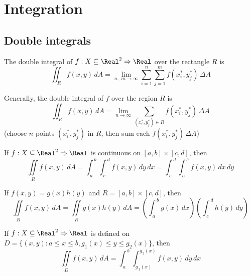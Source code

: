 \section{Integration}

\subsection{Double integrals}



\begin{definition}
  The double integral of $f : X \subseteq \Real^2 \Rightarrow \Real$ over the rectangle $R$ is
  \[
    \iint_{R}{{f\left( {x,y} \right)\,dA}} = \mathop {\lim }_{n,\,\,m \to \infty } \sum_{i = 1}^n {\sum_{j = 1}^m {f\left( {x_i^*,y_j^*} \right)\,\Delta A} }
  \]

  Generally, the double integral of $f$ over the region $R$ is
  \[
    \iint_{R}{{f\left( {x,y} \right)\,dA}} = \mathop {\lim }_{n \to \infty } \sum_{(x_i^*, y_j^*) \in R} {f\left( {x_i^*,y_j^*} \right)\,\Delta A}
  \]
  (choose $n$ points $(x_i^*, y_j^*)$ in $R$, then sum each $f\left( {x_i^*,y_j^*} \right)\,\Delta A$)
\end{definition}

\begin{theorem}
  If $f : X \subseteq \Real^2 \Rightarrow \Real$ is continuous on $[a, b] \times [c, d]$, then
  \[
    \iint\limits_{R}{{f\left( {x,y} \right)\,dA}} = \int_{{\,a}}^{{\,b}}{{\int_{{\,c}}^{{\,d}}{{f\left( {x,y} \right)\,dy}}\,dx}} = \int_{{\,c}}^{{\,d}}{{\int_{{\,a}}^{{\,b}}{{f\left( {x,y} \right)\,dx}}\,dy}}
  \]
\end{theorem}

\begin{theorem}
  If $f(x, y) = g(x) h(y)$ and $R = [a, b] \times [c, d]$, then
  \[
    \iint\limits_{R}{{f\left( {x,y} \right)\,dA}} = \iint\limits_{R}{{g\left( x \right)h\left( y \right)\,dA}} = \left( {\int_{{\,a}}^{{\,b}}{{g\left( x \right)\,dx}}} \right)\left( {\int_{{\,c}}^{{\,d}}{{h\left( y \right)\,dy}}} \right)
  \]
\end{theorem}

\begin{theorem}
  If $f : X \subseteq \Real^2 \Rightarrow \Real$ is defined on $D = \{ (x, y) : a \leq x \leq b, g_1(x) \leq y \leq g_2(x) \}$, then
  \[
    \iint\limits_{D}{{f\left( {x,y} \right)\,dA}} = \int_{{\,a}}^{{\,b}}{{\int_{{{g_{\,1}}\left( x \right)}}^{{{g_{\,2}}\left( x \right)}}{{f\left( {x,y} \right)\,dy}}\,dx}}
  \]
\end{theorem}

